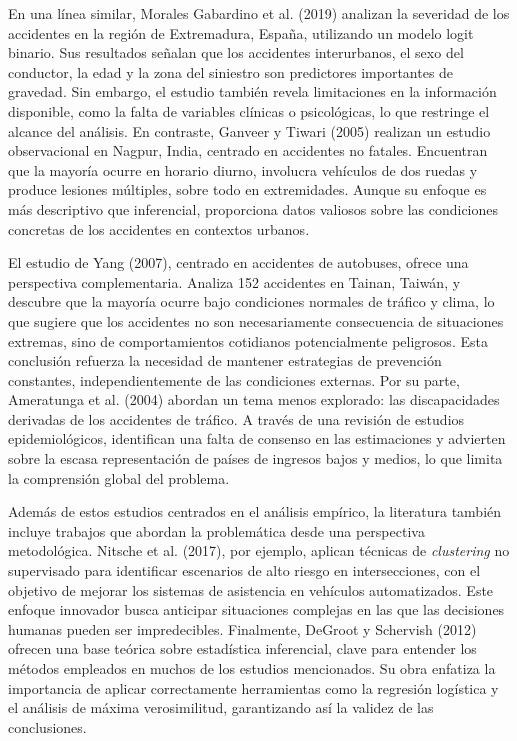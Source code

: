 \documentclass{book}
\begin{document}
En una línea similar, Morales Gabardino et al. (2019) analizan la severidad de los accidentes en la región de Extremadura, España, utilizando un modelo logit binario. Sus resultados señalan que los accidentes interurbanos, el sexo del conductor, la edad y la zona del siniestro son predictores importantes de gravedad. Sin embargo, el estudio también revela limitaciones en la información disponible, como la falta de variables clínicas o psicológicas, lo que restringe el alcance del análisis. En contraste, Ganveer y Tiwari (2005) realizan un estudio observacional en Nagpur, India, centrado en accidentes no fatales. Encuentran que la mayoría ocurre en horario diurno, involucra vehículos de dos ruedas y produce lesiones múltiples, sobre todo en extremidades. Aunque su enfoque es más descriptivo que inferencial, proporciona datos valiosos sobre las condiciones concretas de los accidentes en contextos urbanos.

El estudio de Yang (2007), centrado en accidentes de autobuses, ofrece una perspectiva complementaria. Analiza 152 accidentes en Tainan, Taiwán, y descubre que la mayoría ocurre bajo condiciones normales de tráfico y clima, lo que sugiere que los accidentes no son necesariamente consecuencia de situaciones extremas, sino de comportamientos cotidianos potencialmente peligrosos. Esta conclusión refuerza la necesidad de mantener estrategias de prevención constantes, independientemente de las condiciones externas. Por su parte, Ameratunga et al. (2004) abordan un tema menos explorado: las discapacidades derivadas de los accidentes de tráfico. A través de una revisión de estudios epidemiológicos, identifican una falta de consenso en las estimaciones y advierten sobre la escasa representación de países de ingresos bajos y medios, lo que limita la comprensión global del problema.

Además de estos estudios centrados en el análisis empírico, la literatura también incluye trabajos que abordan la problemática desde una perspectiva metodológica. Nitsche et al. (2017), por ejemplo, aplican técnicas de \textit{clustering} no supervisado para identificar escenarios de alto riesgo en intersecciones, con el objetivo de mejorar los sistemas de asistencia en vehículos automatizados. Este enfoque innovador busca anticipar situaciones complejas en las que las decisiones humanas pueden ser impredecibles. Finalmente, DeGroot y Schervish (2012) ofrecen una base teórica sobre estadística inferencial, clave para entender los métodos empleados en muchos de los estudios mencionados. Su obra enfatiza la importancia de aplicar correctamente herramientas como la regresión logística y el análisis de máxima verosimilitud, garantizando así la validez de las conclusiones.
\end{document}
